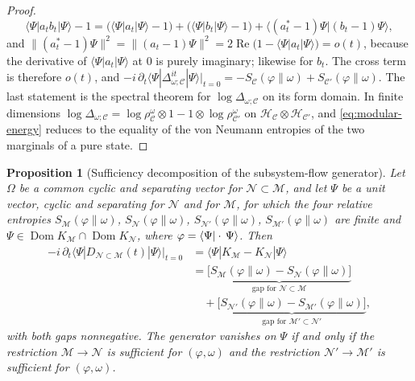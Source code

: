 \documentclass[a4paper,11pt]{article}
\newtheorem{proposition}[theorem]{Proposition}
\theoremstyle{definition}
\newcommand{\mN}{\mathcal{N}}
\newcommand{\mM}{\mathcal{M}}
\begin{document}
\begin{proof}
\begin{equation}
 \langle\Psi|a_tb_t|\Psi\rangle-1
 =\bigl(\langle\Psi|a_t|\Psi\rangle-1\bigr)+\bigl(\langle\Psi|b_t|\Psi\rangle-1\bigr)
 +\langle(a_t^*-1)\Psi|(b_t-1)\Psi\rangle,
\end{equation}
and $\|(a_t^*-1)\Psi\|^2=\|(a_t-1)\Psi\|^2=2\operatorname{Re}\bigl(1-\langle\Psi|a_t|\Psi\rangle\bigr)=o(t)$, because the derivative of $\langle\Psi|a_t|\Psi\rangle$ at $0$ is purely imaginary; likewise for $b_t$. The cross term is therefore $o(t)$, and
$-i\,\partial_t\langle\Psi|\Delta_{\omega;\mathcal C}^{it}|\Psi\rangle|_{t=0}=-S_{\mathcal C}(\varphi\|\omega)+S_{\mathcal C'}(\varphi\|\omega)$. The last statement is the spectral theorem for $\log\Delta_{\omega;\mathcal C}$ on its form domain. In finite dimensions $\log\Delta_{\omega;\mathcal C}=\log\rho^\omega_{\mathcal C}\otimes1-1\otimes\log\rho^\omega_{\mathcal C'}$ on $\mathcal H_{\mathcal C}\otimes\mathcal H_{\mathcal C'}$, and \eqref{eq:modular-energy} reduces to the equality of the von Neumann entropies of the two marginals of a pure state.
\end{proof}

\begin{proposition}[Sufficiency decomposition of the subsystem-flow generator]\label{prop:sufficiency}
Let $\Omega$ be a common cyclic and separating vector for $\mN\subset\mM$, and let $\Psi$ be a unit vector, cyclic and separating for $\mN$ and for $\mM$, for which the four relative entropies $S_{\mM}(\varphi\|\omega)$, $S_{\mN}(\varphi\|\omega)$, $S_{\mN'}(\varphi\|\omega)$, $S_{\mM'}(\varphi\|\omega)$ are finite and $\Psi\in\operatorname{Dom}K_{\mM}\cap\operatorname{Dom}K_{\mN}$, where $\varphi=\braket{\Psi|\cdot\,\Psi}$. Then
\begin{align}
 -i\,\partial_t\langle\Psi|D_{\mN\subset\mM}(t)|\Psi\rangle\big|_{t=0}
 &=\langle\Psi|K_{\mM}-K_{\mN}|\Psi\rangle \nonumber\\
 &=\underbrace{\bigl[S_{\mM}(\varphi\|\omega)-S_{\mN}(\varphi\|\omega)\bigr]}_{\text{gap for }\mN\subset\mM}
 \nonumber\\
 &\quad+\underbrace{\bigl[S_{\mN'}(\varphi\|\omega)-S_{\mM'}(\varphi\|\omega)\bigr]}_{\text{gap for }\mM'\subset\mN'} ,
 \label{eq:sufficiency-decomposition}
\end{align}
with both gaps nonnegative. The generator vanishes on $\Psi$ if and only if the restriction $\mM\to\mN$ is sufficient for $(\varphi,\omega)$ and the restriction $\mN'\to\mM'$ is sufficient for $(\varphi,\omega)$.
\end{proposition}
\end{document}
